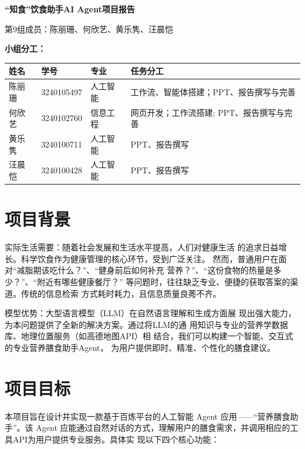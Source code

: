 \documentclass[a4paper,UTF8]{ctexart}
\begin{document}
\begin{center}
\vspace*{1cm}
{\heiti \bfseries {} “知食”饮食助手AI Agent项目报告 \par}
\vspace{1cm}
{\kaishu {} 第9组成员：陈丽珊、何欣艺、黄乐隽、汪晨恺 \par}
\end{center}

{\bfseries 小组分工：}
\begin{center} 
\begin{tabular}{|l|l|l|l|}
\hline
\textbf{姓名} & \textbf{学号} & \textbf{专业} & \textbf{任务分工} \\ \hline
陈丽珊 & 3240105497  & 人工智能 & 工作流、智能体搭建；PPT、报告撰写与完善\\ \hline
何欣艺 & 3240102760 & 信息工程 & 网页开发；工作流搭建; PPT、报告撰写与完善\\ \hline
黄乐隽 & 3240100711 & 人工智能 & PPT、报告撰写 \\ \hline
汪晨恺 & 3240100428 & 人工智能 & PPT、报告撰写 \\ \hline

\end{tabular}
\end{center}


\section{项目背景}
实际生活需要：随着社会发展和生活水平提高，人们对健康生活
的追求日益增长。科学饮食作为健康管理的核心环节，受到广泛关注。
然而，普通用户在面对“减脂期该吃什么？”、“健身前后如何补充
营养？”、“这份食物的热量是多少？”、“附近有哪些健康餐厅？”
等问题时，往往缺乏专业、便捷的获取答案的渠道。传统的信息检索
方式耗时耗力，且信息质量良莠不齐。
\par
模型优势：大型语言模型（LLM）在自然语言理解和生成方面展
现出强大能力，为本问题提供了全新的解决方案。通过将LLM的通
用知识与专业的营养学数据库、地理位置服务（如高德地图API）相
结合，我们可以构建一个智能、交互式的专业营养膳食助手Agent，
为用户提供即时、精准、个性化的膳食建议。

\section{项目目标}
本项目旨在设计并实现一款基于百炼平台的人工智能 Agent 应用——“营养膳食助手”。该 Agent 应能通过自然对话的方式，理解用户的膳食需求，并调用相应的工具API为用户提供专业服务。具体实
现以下四个核心功能：
\end{document}
